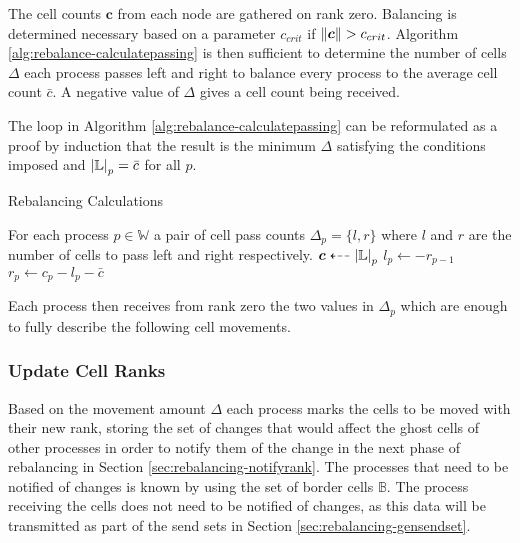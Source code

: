 \documentclass{IIBproject}
\newcommand{\vect} [1] {\bm{#1}}
\newcommand{\dla}{\dashleftarrow}
\numberwithin{figure}{section}
\begin{document}
            The cell counts $\vect{c}$ from each node are gathered on rank zero. Balancing is determined necessary based on a parameter $c_{crit}$ if $\norm{\vect{c}}>c_{crit}$. Algorithm \ref{alg:rebalance-calculatepassing} is then sufficient to determine the number of cells $\Delta$ each process passes left and right to balance every process to the average cell count $\bar c$. A negative value of $\Delta$ gives a cell count being received.

            The loop in Algorithm \ref{alg:rebalance-calculatepassing} can be reformulated as a proof by induction that the result is the minimum $\Delta$ satisfying the conditions imposed and $\abs{\mathbb{L}}_p=\bar c$ for all $p$.

            \begin{algorithm}[H]
                \caption{Rebalancing Calculations}
                \label{alg:rebalance-calculatepassing}

                \begin{algorithmic}
                    \Ensure For each process $p \in \mathbb{W}$ a pair of cell pass counts $\Delta_p = \{l,r\}$ where $l$ and $r$ are the number of cells to pass left and right respectively.
                    \Statex
                    \Gather $\vect{c} \dla \abs{\mathbb{L}}_p $
                        \State $l_p \gets -r_{p-1}$
                        \State $r_p \gets c_p - l_p - \bar{c}$
                    \EndFor
                \end{algorithmic}
            \end{algorithm}

            Each process then receives from rank zero the two values in $\Delta_p$ which are enough to fully describe the following cell movements.



        \subsubsection{Update Cell Ranks} %
            \label{sec:rebalancing-updatecellranks}

            Based on the movement amount $\Delta$ each process marks the cells to be moved with their new rank, storing the set of changes that would affect the ghost cells of other processes in order to notify them of the change in the next phase of rebalancing in Section \ref{sec:rebalancing-notifyrank}. The processes that need to be notified of changes is known by using the set of border cells $\mathbb{B}$. The process receiving the cells does not need to be notified of changes, as this data will be transmitted as part of the send sets in Section \ref{sec:rebalancing-gensendset}.
\end{document}
